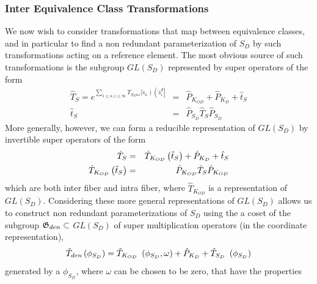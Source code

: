 \subsubsection{Inter Equivalence Class Transformations}

We now wish to consider transformations that map between equivalence
classes, and in particular to find a non redundant parameterization of $%
S_{D} $ by such transformations acting on a reference element. The most
obvious source of such transformations is the subgroup $GL\left(
S_{D}\right) $ represented by super operators of the form 
\begin{eqnarray}
\hat{T}_{S}=e^{\sum_{1\leq \kappa ,\iota \leq \infty }\Upsilon _{S_{D}\kappa
\iota }\left| \breve{s}_{\kappa }\right) \left( \breve{s}_{\iota
}^{d}\right| } &=&\hat{P}_{K_{OD}}+\hat{P}_{K_{D}}+\hat{t}_{S}  \nonumber \\
\hat{t}_{S} &=&\hat{P}_{S_{D}}\hat{T}_{S}\hat{P}_{S_{D}}
\end{eqnarray}%
More generally, however, we can form a reducible representation of $GL\left(
S_{D}\right) $ by invertible super operators of the form 
\begin{eqnarray}
\hat{T}_{S} &=&\hat{T}_{K_{OD}}\left( \hat{t}_{S}\right) +\hat{P}_{K_{D}}+%
\hat{t}_{S}  \nonumber \\
\hat{T}_{K_{OD}}\left( \hat{t}_{S}\right) &=&\hat{P}_{K_{OD}}\hat{T}_{S}\hat{%
P}_{K_{OD}}
\end{eqnarray}%
which are both inter fiber and intra fiber, where $\hat{T}_{K_{OD}}$ is a
representation of $GL\left( S_{D}\right) $. Considering these more general
representations of $GL\left( S_{D}\right) $ allows us to construct non
redundant parameterizations of $S_{D}$ using the a coset of the subgroup $%
{\frak G}_{den}\subset $ $GL\left( S_{D}\right) $ of super multiplication
operators (in the coordinate representation),{\it \ }%
\begin{equation}
\hat{T}_{den}\left( \phi _{S_{D}}\right) =\hat{T}_{K_{OD}{\rm \ }}\left(
\phi _{S_{D}},\omega \right) +\hat{P}_{K_{D}}+\hat{T}_{S_{D}{\rm \ }}\left(
\phi _{S_{D}}\right)  \label{tden}
\end{equation}%
generated by a $\phi _{S_{D}}$, where $\omega $ can be chosen to be zero,
that have the properties 
